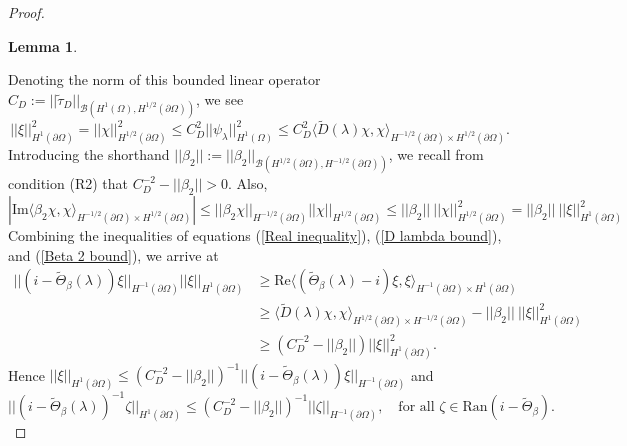 \documentclass{article}
\numberwithin{equation}{section}
\newtheorem{lemma}{Lemma}[section]
\begin{document}
\begin{proof}
\begin{lemma}
    \end{lemma}
    Denoting the norm of this bounded linear operator $C_D:=||\tilde{\tau}_D||_{\mathcal{B}(H^1(\Omega),H^{1/2}(\partial \Omega))}$, we see  
    \begin{equation}\label{D lambda bound}
       ||\xi||_{H^1(\partial \Omega)}^2=||\chi||^2_{H^{1/2}(\partial \Omega)}\leq C_D^2||\psi_\lambda||_{H^1(\Omega)}^2\leq C_D^2  \langle \tilde D(\lambda) \chi, \chi\rangle_{H^{-1/2}(\partial \Omega)\times H^{1/2}(\partial \Omega)}.
    \end{equation}
    Introducing the shorthand $||\beta_2||:=||\beta_2||_{\mathcal{B}(H^{1/2}(\partial \Omega),H^{-1/2}(\partial \Omega))}$, we recall from condition (R2) that $C_D^{-2}-||\beta_2||>0$. Also,
    \begin{equation}\label{Beta 2 bound}
        \left|\text{Im}\langle \beta_2 \chi, \chi \rangle_{H^{-1/2}(\partial \Omega)\times H^{1/2}(\partial \Omega)}\right|\leq ||\beta_2 \chi||_{H^{-1/2}(\partial \Omega)}||\chi||_{H^{1/2}(\partial \Omega)}\leq ||\beta_2||~||\chi||_{H^{1/2}(\partial \Omega)}^2=||\beta_2||~||\xi||_{H^{1}(\partial \Omega)}^2
    \end{equation}
    Combining the inequalities of equations (\ref{Real inequality}), (\ref{D lambda bound}), and (\ref{Beta 2 bound}), we arrive at
    \begin{equation}
     \begin{split}
    ||(i-\tilde{\Theta}_\beta(\lambda))\xi||_{H^{-1}(\partial \Omega)}||\xi||_{H^1(\partial \Omega)}&\geq \text{Re}\langle(\tilde{\Theta}_\beta(\lambda)-i)\xi,\xi \rangle_{H^{-1}(\partial \Omega)\times H^1(\partial \Omega)} 
    \\
    &\geq \langle \tilde D(\lambda)\chi, \chi\rangle_{H^{1/2}(\partial \Omega)\times H^{-1/2}(\partial \Omega)}-  ||\beta_2||~||\xi||_{H^1(\partial \Omega)}^2
    \\
    &\geq \left(C_D^{-2}-||\beta_2||\right)||\xi||_{H^1(\partial \Omega)}^2.
    \end{split}
    \end{equation}
    Hence $||\xi||_{H^1(\partial \Omega)}\leq \left(C_D^{-2}-||\beta_2||\right)^{-1} ||(i-\tilde \Theta _\beta(\lambda) )\xi||_{H^{-1}(\partial \Omega)}$ and
    \begin{equation}
        ||(i-\tilde \Theta_\beta(\lambda))^{-1}\zeta||_{H^1(\partial \Omega)}\leq \left(C_D^{-2}-||\beta_2||\right)^{-1}||\zeta||_{H^{-1}(\partial \Omega)}, \quad \text{for all }\zeta \in \text{Ran}(i-\tilde\Theta_\beta).
    \end{equation}

\end{proof}
\end{document}
